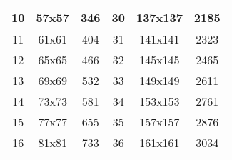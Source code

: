 \begin{appendix}
\begin{table}[htbp]
\begin{tabular}{|c|c|c|c|c|c|}
			10               & 57x57                                                            & 346                                                                          & 30               & 137x137                                                          & 2185                                                                          \\ \hline
			11               & 61x61                                                            & 404                                                                          & 31               & 141x141                                                          & 2323                                                                          \\ \hline
			12               & 65x65                                                            & 466                                                                          & 32               & 145x145                                                          & 2465                                                                          \\ \hline
			13               & 69x69                                                            & 532                                                                          & 33               & 149x149                                                          & 2611                                                                          \\ \hline
			14               & 73x73                                                            & 581                                                                          & 34               & 153x153                                                          & 2761                                                                          \\ \hline
			15               & 77x77                                                            & 655                                                                          & 35               & 157x157                                                          & 2876                                                                          \\ \hline
			16               & 81x81                                                            & 733                                                                          & 36               & 161x161                                                          & 3034                                                                          \\ \hline

\end{tabular}
\end{table}
\end{appendix}
